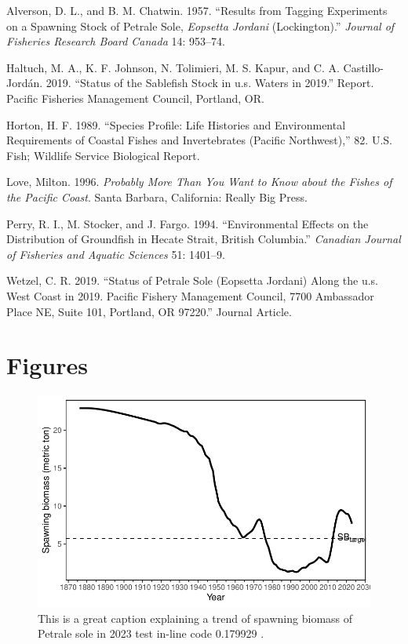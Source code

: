 \documentclass[
]{scrartcl}
\newlength{\cslhangindent}
\newenvironment{CSLReferences}[2] %
 {\begin{list}{}{%
  \setlength{\itemindent}{0pt}
  \setlength{\leftmargin}{0pt}
  \setlength{\parsep}{0pt}
  \ifodd #1
   \setlength{\leftmargin}{\cslhangindent}
   \setlength{\itemindent}{-1\cslhangindent}
  \fi
  \setlength{\itemsep}{#2\baselineskip}}}
 {\end{list}}
\begin{document}
\label{refs}
\begin{CSLReferences}{1}{0}
Alverson, D. L., and B. M. Chatwin. 1957. {``Results from Tagging
Experiments on a Spawning Stock of Petrale Sole, \emph{{Eopsetta}
Jordani} ({Lockington}).''} \emph{Journal of Fisheries Research Board
Canada} 14: 953--74.

Haltuch, M. A., K. F. Johnson, N. Tolimieri, M. S. Kapur, and C. A.
Castillo-Jordán. 2019. {``Status of the Sablefish Stock in u.s. Waters
in 2019.''} Report. Pacific Fisheries Management Council, Portland, OR.

Horton, H. F. 1989. {``Species Profile: Life Histories and Environmental
Requirements of Coastal Fishes and Invertebrates ({Pacific}
{Northwest}),''} 82. U.S. Fish; Wildlife Service Biological Report.

Love, Milton. 1996. \emph{Probably More Than You Want to Know about the
Fishes of the {Pacific} {Coast}}. Santa Barbara, California: Really Big
Press.

Perry, R. I., M. Stocker, and J. Fargo. 1994. {``Environmental Effects
on the Distribution of Groundfish in {Hecate} {Strait}, {British}
{Columbia}.''} \emph{Canadian Journal of Fisheries and Aquatic Sciences}
51: 1401--9.

Wetzel, C. R. 2019. {``Status of Petrale Sole (Eopsetta Jordani) Along
the u.s. West Coast in 2019. Pacific Fishery Management Council, 7700
Ambassador Place NE, Suite 101, Portland, OR 97220.''} Journal Article.

\end{CSLReferences}

\section{Figures}\label{figures}

\begin{figure}[H]

{\centering \includegraphics{accessibility_reprex_files/figure-pdf/spawn_bio-1.pdf}

}

\caption{This is a great caption explaining a trend of spawning biomass
of Petrale sole in 2023 test in-line code 0.179929 .}

\end{figure}%
\end{document}
